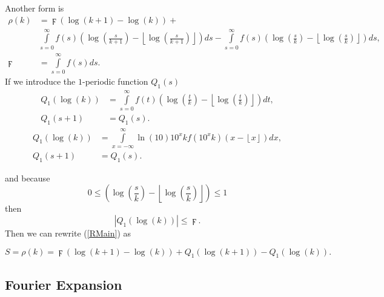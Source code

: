 \documentclass[titlepage,fleqn]{article}%
\begin{document}
\bigskip Another form is%
\begin{align}
\rho(k)  &  =\digamma\left(  \log(k+1)-\log(k)\right)  +\label{RMain}\\
&
{\displaystyle\int\limits_{s=0}^{\infty}}
f(s)\left(  \log\left(  \frac{s}{k+1}\right)  -\left\lfloor \log\left(
\frac{s}{k+1}\right)  \right\rfloor \right)  ds-%
{\displaystyle\int\limits_{s=0}^{\infty}}
f(s)\left(  \log\left(  \frac{s}{k}\right)  -\left\lfloor \log\left(  \frac
{s}{k}\right)  \right\rfloor \right)  ds,\nonumber\\
\digamma &  =%
{\displaystyle\int\limits_{s=0}^{\infty}}
f(s)ds.
\end{align}
If we introduce the $1$-periodic function $Q_{1}(s)$
\begin{align}
Q_{1}(\log(k))  &  =%
{\displaystyle\int\limits_{s=0}^{\infty}}
f(t)\left(  \log\left(  \frac{t}{k}\right)  -\left\lfloor \log\left(  \frac
{t}{k}\right)  \right\rfloor \right)  dt,\label{EM7}\\
Q_{1}(s+1)  &  =Q_{1}(s).\nonumber
\end{align}%
\begin{align}
Q_{1}(\log(k))  &  =%
{\displaystyle\int\limits_{x=-\infty}^{\infty}}
\ln(10)10^{x}kf(10^{x}k)\left(  x-\left\lfloor x\right\rfloor \right)  dx,\\
Q_{1}(s+1)  &  =Q_{1}(s).\nonumber
\end{align}


\noindent and because%
\[
0\leq\left(  \log\left(  \frac{s}{k}\right)  -\left\lfloor \log\left(
\frac{s}{k}\right)  \right\rfloor \right)  \leq1
\]
then%
\[
\left\vert Q_{1}(\log(k))\right\vert \leq\digamma.
\]
Then we can rewrite (\ref{RMain}) as%

\begin{equation}
S=\rho(k)=\digamma\left(  \log\left(  k+1\right)  -\log\left(  k\right)
\right)  +Q_{1}(\log(k+1))-Q_{1}(\log(k)). \label{MainEM0}%
\end{equation}


\subsection{Fourier Expansion}
\end{document}
